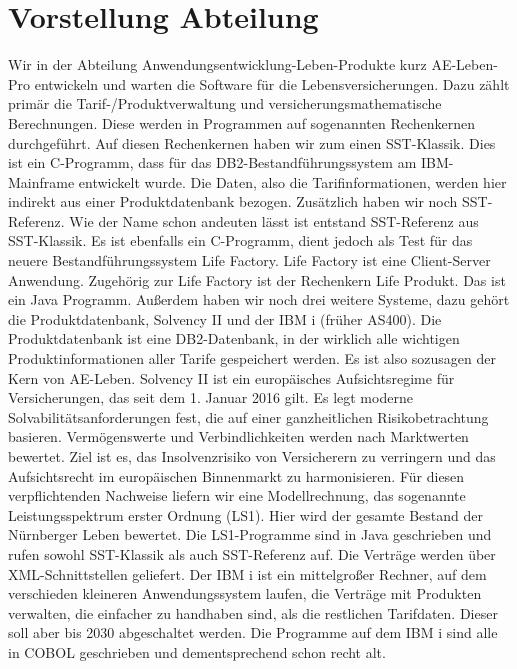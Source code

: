 \section{Vorstellung Abteilung}
Wir in der Abteilung Anwendungsentwicklung-Leben-Produkte kurz AE-Leben-Pro entwickeln und warten die Software für die Lebensversicherungen.
Dazu zählt primär die Tarif-/Produktverwaltung und versicherungsmathematische Berechnungen. Diese werden in Programmen auf sogenannten Rechenkernen durchgeführt.
Auf diesen Rechenkernen haben wir zum einen SST-Klassik. Dies ist ein C-Programm, dass für das DB2-Bestandführungssystem am IBM-Mainframe entwickelt wurde.
Die Daten, also die Tarifinformationen, werden hier indirekt aus einer Produktdatenbank bezogen.
Zusätzlich haben wir noch SST-Referenz. Wie der Name schon andeuten lässt ist entstand SST-Referenz aus SST-Klassik. Es ist ebenfalls ein C-Programm, dient jedoch als Test für das neuere
Bestandführungssystem Life Factory. Life Factory ist eine Client-Server Anwendung. Zugehörig zur Life Factory ist der Rechenkern Life Produkt. Das ist ein Java Programm.
Außerdem haben wir noch drei weitere Systeme, dazu gehört die Produktdatenbank, Solvency II und der IBM i (früher AS400).
Die Produktdatenbank ist eine DB2-Datenbank, in der wirklich alle wichtigen Produktinformationen aller Tarife gespeichert werden. Es ist also sozusagen der Kern von AE-Leben.
Solvency II ist ein europäisches Aufsichtsregime für Versicherungen, das seit dem 1. Januar 2016 gilt. Es legt moderne Solvabilitätsanforderungen fest, die auf einer ganzheitlichen Risikobetrachtung basieren. Vermögenswerte und Verbindlichkeiten werden nach Marktwerten bewertet. Ziel ist es, das Insolvenzrisiko von Versicherern zu verringern und das Aufsichtsrecht im europäischen Binnenmarkt zu harmonisieren. \cite{Bafin2016}
Für diesen verpflichtenden Nachweise liefern wir eine Modellrechnung, das sogenannte Leistungsspektrum erster Ordnung (LS1). Hier wird der gesamte Bestand der Nürnberger Leben bewertet. Die LS1-Programme sind in Java geschrieben und rufen sowohl SST-Klassik als auch SST-Referenz auf. Die Verträge werden über XML-Schnittstellen geliefert.
Der IBM i ist ein mittelgroßer Rechner, auf dem verschieden kleineren Anwendungssystem laufen, die Verträge mit Produkten verwalten, die einfacher zu handhaben sind, als die restlichen Tarifdaten. Dieser soll aber bis 2030 abgeschaltet werden.
Die Programme auf dem IBM i sind alle in COBOL geschrieben und dementsprechend schon recht alt. 

